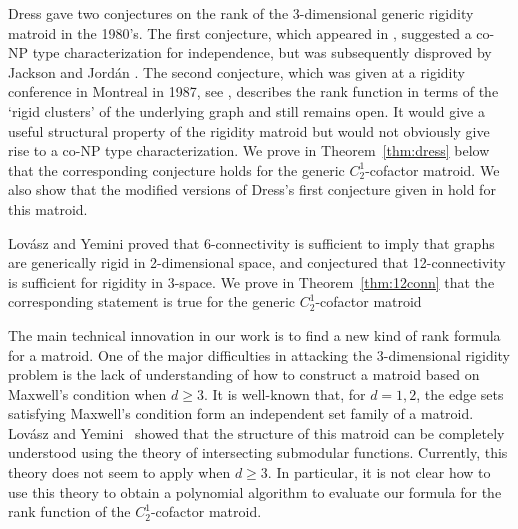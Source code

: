 \documentclass{daj}
\begin{document}
Dress gave two conjectures on the rank of the 3-dimensional generic rigidity matroid in the 1980's. The first conjecture, which appeared in \cite{DDH83}, suggested a co-NP type  characterization for independence, but was subsequently disproved by Jackson and Jord{\'a}n \cite{JJ05}. The second conjecture, which was given at a rigidity conference in Montreal in 1987, see \cite{CDT,GSS93,T99}, describes the rank function in terms of the `rigid clusters' of the underlying graph and still remains open. It would give a useful structural property of the rigidity matroid but would not obviously give rise to a co-NP type characterization.  We prove in Theorem~\ref{thm:dress} below that the corresponding conjecture holds for the generic $C_2^1$-cofactor matroid.
We also show that  the modified versions of Dress's first conjecture given in \cite{JJ06,JDIMACS} hold for this matroid.

Lov{\'a}sz and Yemini \cite{LY82} proved that 6-connectivity is sufficient to imply that  graphs are generically rigid in 2-dimensional space, and conjectured that 12-connectivity is sufficient for  rigidity in 3-space.  We prove in Theorem~\ref{thm:12conn} that the corresponding statement is true for  the generic $C_2^1$-cofactor matroid 

The main technical innovation in our work is to find a new kind  of  rank formula for a matroid.
One of the major difficulties in attacking the 3-dimensional rigidity problem is the lack of understanding of how to construct a matroid based on Maxwell's condition when $d\geq 3$.
It is well-known that, for $d=1,2$, the edge sets satisfying Maxwell's condition form an independent set family of a matroid.  Lov{\'a}sz and Yemini~\cite{LY82} showed that the structure of this matroid can be completely understood using the theory of intersecting submodular functions.
Currently, this theory does  not seem to apply when  $d\geq 3$. In particular, it is not clear how to use this theory to obtain a polynomial algorithm to evaluate our formula for the rank function of the $C_2^1$-cofactor matroid.
\end{document}
